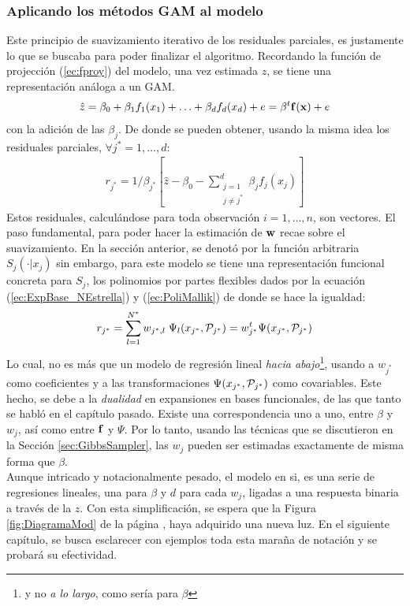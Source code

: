 \documentclass[../Main/Main.tex]{subfiles}
\begin{document}
\subsubsection{Aplicando los métodos GAM al modelo}
Este principio de suavizamiento iterativo de los residuales parciales, es justamente lo que se buscaba para poder finalizar el algoritmo.  Recordando la función de projección (\ref{ec:fproy}) del modelo, una vez estimada $z$, se tiene una representación análoga a un GAM.
\begin{align*}
	\hat{z} = \beta_0 + \beta_1f_1(x_1) + \ldots + \beta_df_d(x_d) + e = \beta^t\fsn(\xsn) + e
\end{align*}
con la adición de las $\beta_j$. De donde se pueden obtener, usando la misma idea los residuales parciales, $\forall j^*=1,\ldots,d$:
\begin{align*}
r_{j^*} = 1/\beta_{j^*}[\hat{z} - \beta_0 - \sum_{\substack{j=1\\ j \neq j^*}}^d \beta_j f_j(x_j)]
\end{align*}
Estos residuales, calculándose para toda observación $i = 1,\ldots,n$, son vectores. El paso fundamental, para poder hacer la estimación de $\wsn$ recae sobre el suavizamiento. En la sección anterior, se denotó por la función arbitraria $S_j(\cdot|x_j)$ sin embargo, para este modelo se tiene una representación funcional concreta para $S_j$, los polinomios por partes flexibles dados por la ecuación (\ref{ec:ExpBase_NEstrella}) y (\ref{ec:PoliMallik}) de donde se hace la igualdad:
\begin{equation}
	r_{j^*} = \sum_{l = 1}^{N^*} w_{j^*,l} \; \Psi_l(x_{j^*},\P_{j^*}) = w_{j^*}^t\Psi(x_{j^*},\P_{j^*}) \label{ec:RegResiduales}
\end{equation}
Lo cual, no es más que un modelo de regresión lineal \textit{hacia abajo}\footnote{y no \textit{a lo largo}, como sería para $\beta$}, usando a $w_{j^*}$ como coeficientes y a las transformaciones $\Psi(x_{j^*},\P_{j^*})$ como covariables. Este hecho, se debe a la \textit{dualidad} en expansiones en bases funcionales, de las que tanto se habló en el capítulo pasado. Existe una correspondencia uno a uno, entre $\beta$ y $w_j$, así como entre $\fsn$ y $\Psi$. Por lo tanto, usando las técnicas que se discutieron en la Sección \ref{sec:GibbsSampler}, las $w_j$ pueden ser estimadas exactamente de misma forma que $\beta$.\\

Aunque intricado y notacionalmente pesado, el modelo en si, es una serie de regresiones lineales, una para $\beta$ y $d$ para cada $w_j$, ligadas a una respuesta binaria a través de la $z$. Con esta simplificación, se espera que la Figura \ref{fig:DiagramaMod} de la página \pageref{fig:DiagramaMod}, haya adquirido una nueva luz. En el siguiente capítulo, se busca esclarecer con ejemplos toda esta maraña de notación y se probará su efectividad.
\end{document}
